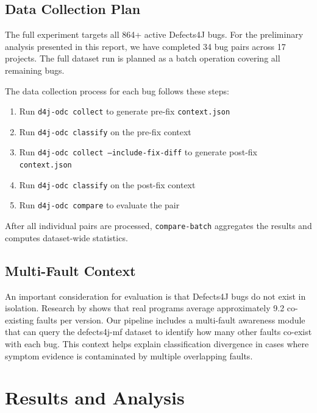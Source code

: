 \documentclass{iutbscthesis}
\begin{document}
\section{Data Collection Plan}

The full experiment targets all 864+ active Defects4J bugs. For the preliminary analysis presented in this report, we have completed 34 bug pairs across 17 projects. The full dataset run is planned as a batch operation covering all remaining bugs.

The data collection process for each bug follows these steps:
\begin{enumerate}
    \item Run \texttt{d4j-odc collect} to generate pre-fix \texttt{context.json}
    \item Run \texttt{d4j-odc classify} on the pre-fix context
    \item Run \texttt{d4j-odc collect --include-fix-diff} to generate post-fix \texttt{context.json}
    \item Run \texttt{d4j-odc classify} on the post-fix context
    \item Run \texttt{d4j-odc compare} to evaluate the pair
\end{enumerate}

After all individual pairs are processed, \texttt{compare-batch} aggregates the results and computes dataset-wide statistics.

\section{Multi-Fault Context}

An important consideration for evaluation is that Defects4J bugs do not exist in isolation. Research by \textcite{callaghan2024mf} shows that real programs average approximately 9.2 co-existing faults per version. Our pipeline includes a multi-fault awareness module that can query the defects4j-mf dataset to identify how many other faults co-exist with each bug. This context helps explain classification divergence in cases where symptom evidence is contaminated by multiple overlapping faults.


\chapter{Results and Analysis}
\end{document}
